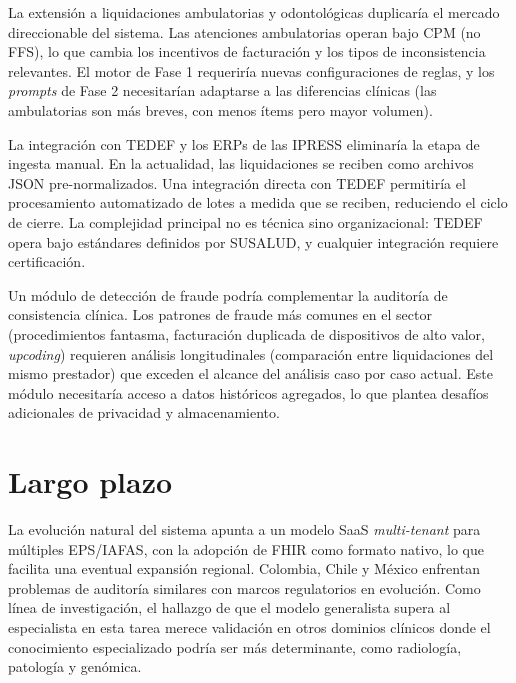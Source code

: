 La extensión a liquidaciones ambulatorias y odontológicas duplicaría el mercado direccionable del sistema. Las atenciones ambulatorias operan bajo CPM (no FFS), lo que cambia los incentivos de facturación y los tipos de inconsistencia relevantes. El motor de Fase 1 requeriría nuevas configuraciones de reglas, y los \textit{prompts} de Fase 2 necesitarían adaptarse a las diferencias clínicas (las ambulatorias son más breves, con menos ítems pero mayor volumen).

La integración con TEDEF y los ERPs de las IPRESS eliminaría la etapa de ingesta manual. En la actualidad, las liquidaciones se reciben como archivos JSON pre-normalizados. Una integración directa con TEDEF permitiría el procesamiento automatizado de lotes a medida que se reciben, reduciendo el ciclo de cierre. La complejidad principal no es técnica sino organizacional: TEDEF opera bajo estándares definidos por SUSALUD, y cualquier integración requiere certificación.

Un módulo de detección de fraude podría complementar la auditoría de consistencia clínica. Los patrones de fraude más comunes en el sector (procedimientos fantasma, facturación duplicada de dispositivos de alto valor, \textit{upcoding}) requieren análisis longitudinales (comparación entre liquidaciones del mismo prestador) que exceden el alcance del análisis caso por caso actual. Este módulo necesitaría acceso a datos históricos agregados, lo que plantea desafíos adicionales de privacidad y almacenamiento.

\section{Largo plazo}

La evolución natural del sistema apunta a un modelo SaaS \textit{multi-tenant} para múltiples EPS/IAFAS, con la adopción de FHIR como formato nativo, lo que facilita una eventual expansión regional. Colombia, Chile y México enfrentan problemas de auditoría similares con marcos regulatorios en evolución. Como línea de investigación, el hallazgo de que el modelo generalista supera al especialista en esta tarea merece validación en otros dominios clínicos donde el conocimiento especializado podría ser más determinante, como radiología, patología y genómica.
